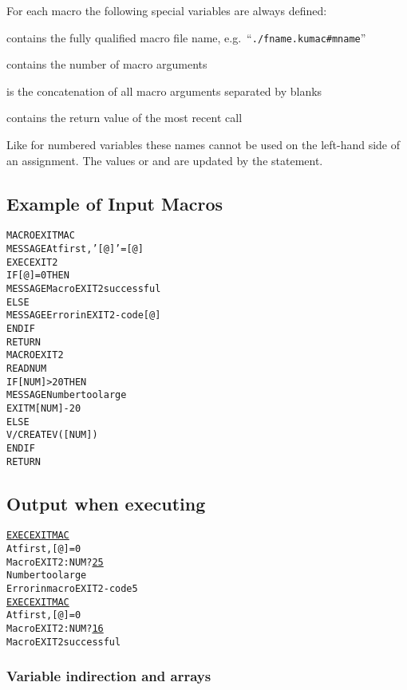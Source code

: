 For each macro the following special variables are always defined:
\MacVar[special]{}
\begin{UL}

\item {}
  contains the fully qualified macro file name,
  e.g.\ ``\texttt{./fname.kumac\#mname}''

\item {}
  contains the number of macro arguments

\item {}
  is the concatenation of all macro arguments separated by blanks

\item {}
  contains the return value of the most recent  call

\end{UL}
Like for numbered variables these names cannot be used on the
left-hand side of an assignment.
The values or \MacVar{\#} and \MacVar{*} are updated by the 
statement.

\subsection*{Example of Input Macros}
\begin{alltt}
MACRO EXITMAC                       
  MESSAGE At first, '[@]' = [@]
  EXEC EXIT2
  IF [@] = 0 THEN
     MESSAGE Macro EXIT2 successful
  ELSE
     MESSAGE Error in EXIT2 - code [@]
  ENDIF
RETURN
MACRO EXIT2
  READ NUM
  IF [NUM] > 20 THEN
     MESSAGE Number too large
     EXITM [NUM]-20
  ELSE
     V/CREATE V([NUM])
  ENDIF
RETURN
\end{alltt}
\subsection*{Output when executing} 
\begin{alltt}
\PROMPT{} \underline{EXEC EXITMAC}
At first, [@] = 0
Macro EXIT2: NUM ? \underline{25}
Number too large
Error in macro EXIT2 - code 5
\PROMPT{} \underline{EXEC EXITMAC}
At first, [@] = 0
Macro EXIT2: NUM ? \underline{16}
Macro EXIT2 successful
\end{alltt}

\subsubsection{Variable indirection and arrays} 

